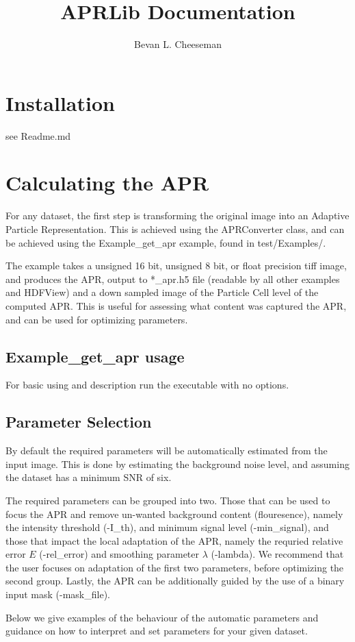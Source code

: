 \documentclass[12pt]{article}
\title{APRLib Documentation}
\author
{Bevan L. Cheeseman}
\begin{document}
\maketitle

\section{Installation}
see Readme.md

\section{Calculating the APR}
For any dataset, the first step is transforming the original image into an Adaptive Particle Representation. This is achieved using the APRConverter class, and can be achieved using the Example\_get\_apr example, found in test/Examples/.

The example takes a unsigned 16 bit, unsigned 8 bit, or float precision tiff image, and produces the APR, output to  *\_apr.h5 file (readable by all other examples and HDFView) and a down sampled image of the Particle Cell level of the computed APR. This is useful for assessing what content was captured the APR, and can be used for optimizing parameters.
\subsection{Example\_get\_apr usage}
For basic using and description run the executable with no options.
\subsection{Parameter Selection}
By default the required parameters will be automatically estimated from the input image. This is done by estimating the background noise level, and assuming the dataset has a minimum SNR of six. 

The required parameters can be grouped into two. Those that can be used to focus the APR and remove un-wanted background content (flouresence), namely the intensity threshold (-I\_th), and minimum signal level (-min\_signal), and those that impact the local adaptation of the APR, namely the requried relative error $E$ (-rel\_error) and smoothing parameter $\lambda$ (-lambda). We recommend that the user focuses on adaptation of the first two parameters, before optimizing the second group. Lastly, the APR can be additionally guided by the use of a binary input mask (-mask\_file).

Below we give examples of the behaviour of the automatic parameters and guidance on how to interpret and set parameters for your given dataset.
\end{document}

